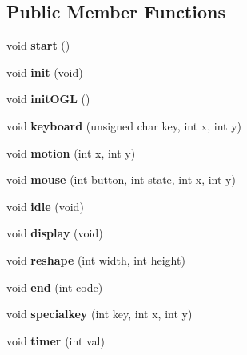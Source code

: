 \subsection*{Public Member Functions}
\begin{DoxyCompactItemize}
\item 
void {\bfseries start} ()\label{classSoundfieldViewer_1_1RenderEngine_ab7531995e03a40bbbf77f7ef9198da14}

\item 
void {\bfseries init} (void)\label{classSoundfieldViewer_1_1RenderEngine_aa5c1a496f448451dc5a0e931422993db}

\item 
void {\bf init\-O\-G\-L} ()
\item 
void {\bfseries keyboard} (unsigned char key, int x, int y)\label{classSoundfieldViewer_1_1RenderEngine_a9e2f5fa9d53eb4c0952c30c039911263}

\item 
void {\bfseries motion} (int x, int y)\label{classSoundfieldViewer_1_1RenderEngine_a83371f716decffa3c8530ae1b2f80fc1}

\item 
void {\bfseries mouse} (int button, int state, int x, int y)\label{classSoundfieldViewer_1_1RenderEngine_ace113c57e2b31b1e726aed8fe2f2f6a6}

\item 
void {\bfseries idle} (void)\label{classSoundfieldViewer_1_1RenderEngine_ae0c7b037c2e1f9ed2c92ef1e16a2ec5b}

\item 
void {\bfseries display} (void)\label{classSoundfieldViewer_1_1RenderEngine_a838f78771ad1fefd42b2feb809097116}

\item 
void {\bfseries reshape} (int width, int height)\label{classSoundfieldViewer_1_1RenderEngine_a23997258136335ec3b85565ad99389d2}

\item 
void {\bfseries end} (int code)\label{classSoundfieldViewer_1_1RenderEngine_a4da60ffb997df5caa3a1c8fcbad7bbbf}

\item 
void {\bfseries specialkey} (int key, int x, int y)\label{classSoundfieldViewer_1_1RenderEngine_a279bae787e48211e3cea8f450a511281}

\item 
void {\bfseries timer} (int val)\label{classSoundfieldViewer_1_1RenderEngine_a5bc88cf1002b2d45767b319aa9984eec}


\end{DoxyCompactItemize}
